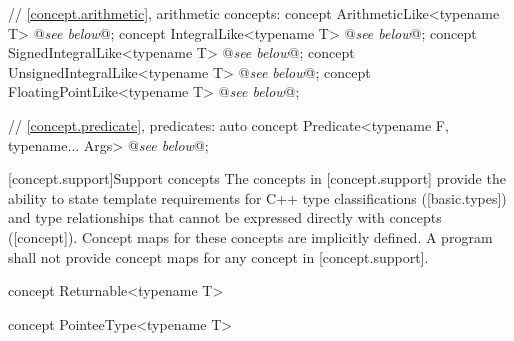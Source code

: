 \documentclass[american,twoside]{book}
\begin{document}
\begin{codeblock}
{  // \ref{concept.arithmetic}, arithmetic concepts:
  concept ArithmeticLike<typename T> @\textit{see below}@;
  concept IntegralLike<typename T> @\textit{see below}@;
  concept SignedIntegralLike<typename T> @\textit{see below}@;
  concept UnsignedIntegralLike<typename T> @\textit{see below}@;
  concept FloatingPointLike<typename T> @\textit{see below}@;

  // \ref{concept.predicate}, predicates:
  auto concept Predicate<typename F, typename... Args> @\textit{see below}@;
}
\end{codeblock}

[concept.support]{Support concepts}
\pnum
The concepts in [concept.support] provide the ability to state
template requirements for C++ type classifications ([basic.types]) and
type relationships that cannot be expressed directly with concepts
([concept]). Concept maps for these concepts are implicitly defined.
A program shall not provide concept maps for any concept in
[concept.support].

\begin{itemdecl}
concept Returnable<typename T> { }
\end{itemdecl}

\begin{itemdescr}
\pnum
{}

\pnum
{}
\end{itemdescr}

\begin{itemdecl}
concept PointeeType<typename T> { }
\end{itemdecl}

\begin{itemdescr}
\pnum
{}

\pnum 
{}
\end{itemdescr}
\end{document}
